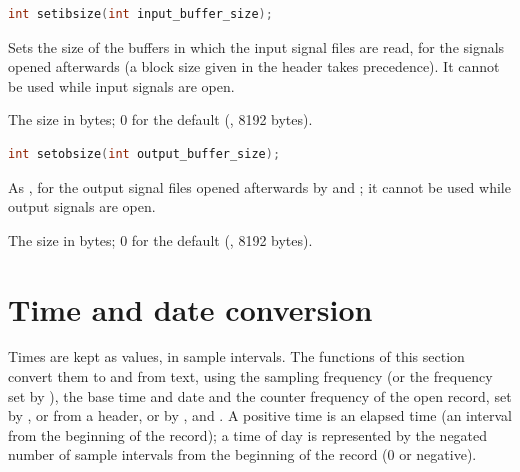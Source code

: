 \begin{lstlisting}[language=C,style=signature]
int setibsize(int input_buffer_size);
\end{lstlisting}
Sets the size of the buffers in which the input signal files are read, for
the signals opened afterwards (a block size given in the header takes
precedence). It cannot be used while input signals are open.
\begin{params}
\item[input\_buffer\_size] The size in bytes; 0 for the default
  (, 8192 bytes).
\end{params}

\begin{lstlisting}[language=C,style=signature]
int setobsize(int output_buffer_size);
\end{lstlisting}
As , for the output signal files opened afterwards by
 and ; it cannot be used while output signals
are open.
\begin{params}
\item[output\_buffer\_size] The size in bytes; 0 for the default
  (, 8192 bytes).
\end{params}

\section{Time and date conversion}
\label{sec:library-time}

Times are kept as  values, in sample intervals. The
functions of this section convert them to and from text, using the sampling
frequency (or the frequency set by ), the base time and date
and the counter frequency of the open record, set by ,
 or  from a header, or by ,
 and . A positive time is an elapsed time
(an interval from the beginning of the record); a time of day is represented
by the negated number of sample intervals from the beginning of the record
(0 or negative).

